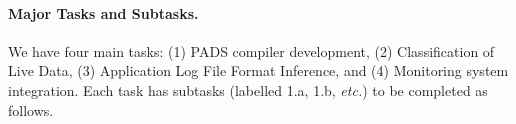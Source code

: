 % 
% 

\paragraph*{Major Tasks and Subtasks.}
We have four main tasks: (1) PADS compiler development, 
(2) Classification of Live Data, (3) Application Log File Format Inference,
and (4) Monitoring system integration.  Each task has subtasks
(labelled 1.a, 1.b, {\em etc.}) to be completed as follows.

